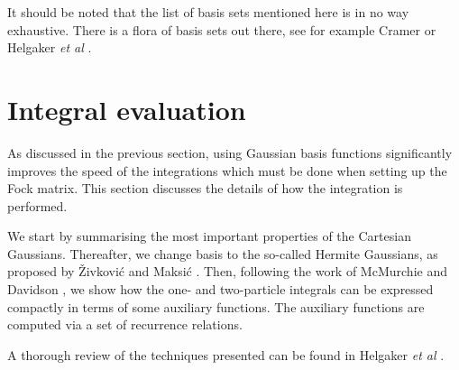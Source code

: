 
It should be noted that the list of basis sets mentioned here is in no way exhaustive. There is a flora of basis sets out there, see for example
Cramer \cite{Cramer} or Helgaker \emph{et al} \cite{Helgaker}.




\section{Integral evaluation}
As discussed in the previous section, using Gaussian basis functions significantly improves the speed of the integrations which must be done when setting up the Fock matrix.
This section discusses the details of how the integration is performed.

We start by summarising the most important properties of the Cartesian Gaussians. Thereafter, we
change basis to the so-called Hermite Gaussians, as proposed by \v{Z}ivkovi\'{c} and Maksi\'{c} \cite{zivkovic_maksic}.
Then, following the work of McMurchie and Davidson \cite{mcmurchie_davidson}, we show how the one- and two-particle integrals can be expressed compactly in
terms of some auxiliary functions. The auxiliary functions are computed via a set of recurrence relations.

A thorough review of the techniques presented can be found in Helgaker \emph{et al} \cite{Helgaker}.

